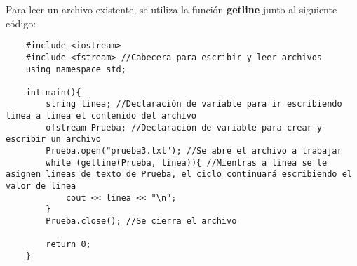 Para leer un archivo existente, se utiliza la función \textbf{getline} junto al siguiente código:
\begin{lstlisting}
    #include <iostream>
    #include <fstream> //Cabecera para escribir y leer archivos
    using namespace std;
    
    int main(){
        string linea; //Declaración de variable para ir escribiendo linea a linea el contenido del archivo
        ofstream Prueba; //Declaración de variable para crear y escribir un archivo
        Prueba.open("prueba3.txt"); //Se abre el archivo a trabajar
        while (getline(Prueba, linea)){ //Mientras a linea se le asignen lineas de texto de Prueba, el ciclo continuará escribiendo el valor de linea
            cout << linea << "\n";
        }
        Prueba.close(); //Se cierra el archivo
        
        return 0;
    }
\end{lstlisting}